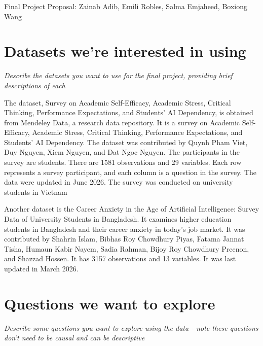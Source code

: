 \documentclass[a4 paper, 12pt]{elsarticle}
\begin{document}
\begin{center} \large Final Project Proposal: Zainab Adib, Emili Robles, Salma Emjaheed, Boxiong Wang \end{center}
\vspace{2mm}

\section*{Datasets we're interested in using}

\textit{Describe the datasets you want to use for the final project, providing brief descriptions of each}

\text The dataset, Survey on Academic Self-Efficacy, Academic Stress, Critical Thinking, Performance Expectations, and Students’ AI Dependency, is obtained from Mendeley Data, a research data repository. It is a survey on Academic Self-Efficacy, Academic Stress, Critical Thinking, Performance Expectations, and Students’ AI Dependency. The dataset was contributed by Quynh Pham Viet, Duy Nguyen, Xiem Nguyen, and Dat Ngoc Nguyen.
The participants in the survey are students. There are 1581 observations and 29 variables. Each row represents a survey participant, and each column is a question in the survey. The data were updated in June 2026. The survey was conducted on university students in Vietnam

Another dataset is the Career Anxiety in the Age of Artificial Intelligence: Survey Data of University Students in Bangladesh. It examines higher education students in Bangladesh and their career anxiety in today’s job market. It was contributed by Shahrin Islam, Bibhas Roy Chowdhury Piyas, Fatama Jannat Tisha, Humaun Kabir Nayem, Sadia Rahman, Bijoy Roy Chowdhury Preenon, and Shazzad Hossen. It has 3157 observations and 13 variables. It was last updated in March 2026. 




\section*{Questions we want to explore}

\textit{Describe some questions you want to explore using the data - note these questions don't need to be causal and can be descriptive}
\end{document}
